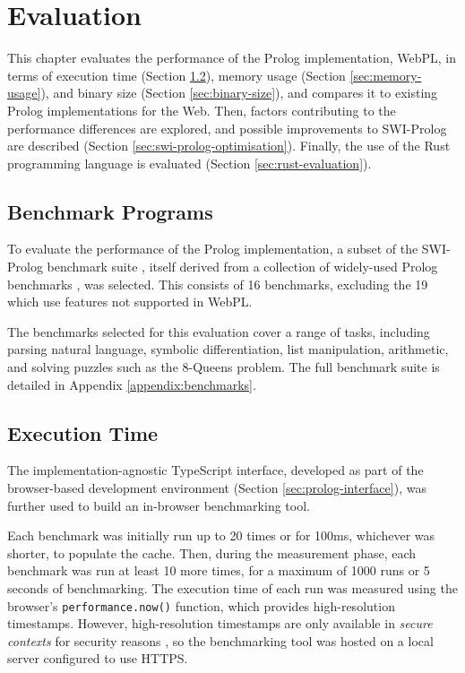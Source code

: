 
\chapter{Evaluation}

This chapter evaluates the performance of the Prolog implementation, WebPL, in terms of execution time (Section \ref{sec:execution-time}), memory usage (Section \ref{sec:memory-usage}), and binary size (Section \ref{sec:binary-size}), and compares it to existing Prolog implementations for the Web. Then, factors contributing to the performance differences are explored, and possible improvements to SWI-Prolog are described (Section \ref{sec:swi-prolog-optimisation}). Finally, the use of the Rust programming language is evaluated (Section \ref{sec:rust-evaluation}).

\section{Benchmark Programs}

To evaluate the performance of the Prolog implementation, a subset of the SWI-Prolog benchmark suite \cite{wielemakerSWIPrologbenchmarksuite2010}, itself derived from a collection of widely-used Prolog benchmarks \cite{haygoodPrologBenchmarkSuite1989}, was selected. This consists of 16 benchmarks, excluding the 19 which use features not supported in WebPL.

The benchmarks selected for this evaluation cover a range of tasks, including parsing natural language, symbolic differentiation, list manipulation, arithmetic, and solving puzzles such as the 8-Queens problem. The full benchmark suite is detailed in Appendix \ref{appendix:benchmarks}.

\section{Execution Time}

\label{sec:execution-time}

The implementation-agnostic TypeScript interface, developed as part of the browser-based development environment (Section \ref{sec:prolog-interface}), was further used to build an in-browser benchmarking tool.

Each benchmark was initially run up to 20 times or for 100ms, whichever was shorter, to populate the cache. Then, during the measurement phase, each benchmark was run at least 10 more times, for a maximum of 1000 runs or 5 seconds of benchmarking. The execution time of each run was measured using the browser's \texttt{performance.now()} function, which provides high-resolution timestamps. However, high-resolution timestamps are only available in \emph{secure contexts} for security reasons \cite{sanchez-rolaClockClockTimeBased2018}, so the benchmarking tool was hosted on a local server configured to use HTTPS.

